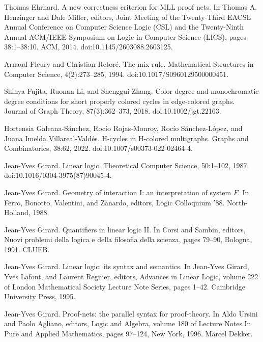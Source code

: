 \par\noindent  [10]  Thomas Ehrhard.  A new correctness criterion for MLL proof nets.  In Thomas A. Henzinger and Dale Miller, editors, Joint Meeting of the Twenty-Third EACSL Annual Conference on Computer Science Logic (CSL) and the Twenty-Ninth Annual ACM/IEEE Symposium on Logic in Computer Science (LICS), pages 38:1–38:10. ACM, 2014.  doi:10.1145/2603088.2603125.  
 
\par\noindent  [11]  Arnaud Fleury and Christian Retoré.  The mix rule.  Mathematical Structures in Computer Science, 4(2):273–285, 1994.  doi:10.1017/S0960129500000451.  
 
\par\noindent  [12]  Shinya Fujita, Ruonan Li, and Shenggui Zhang.  Color degree and monochromatic degree conditions for short properly colored cycles in edge-colored graphs.  Journal of Graph Theory, 87(3):362–373, 2018.  doi:10.1002/jgt.22163.  
 
\par\noindent  [13]  Hortensia Galeana-Sánchez, Rocío Rojas-Monroy, Rocío Sánchez-López, and Juana Imelda Villareal-Valdés.  H-cycles in H-colored multigraphs.  Graphs and Combinatorics, 38:62, 2022.  doi:10.1007/s00373-022-02464-4.  
 
\par\noindent  [14]  Jean-Yves Girard.  Linear logic.  Theoretical Computer Science, 50:1–102, 1987.  doi:10.1016/0304-3975(87)90045-4.  
 
\par\noindent  [15]  Jean-Yves Girard.  Geometry of interaction I: an interpretation of system ${F}$.  In Ferro, Bonotto, Valentini, and Zanardo, editors, Logic Colloquium ’88. North-Holland, 1988.  
 
\par\noindent  [16]  Jean-Yves Girard.  Quantifiers in linear logic II.  In Corsi and Sambin, editors, Nuovi problemi della logica e della filosofia della scienza, pages 79–90, Bologna, 1991. CLUEB.  
 
\par\noindent  [17]  Jean-Yves Girard.  Linear logic: its syntax and semantics.  In Jean-Yves Girard, Yves Lafont, and Laurent Regnier, editors, Advances in Linear Logic, volume 222 of London Mathematical Society Lecture Note Series, pages 1–42. Cambridge University Press, 1995.  
 
\par\noindent  [18]  Jean-Yves Girard.  Proof-nets: the parallel syntax for proof-theory.  In Aldo Ursini and Paolo Agliano, editors, Logic and Algebra, volume 180 of Lecture Notes In Pure and Applied Mathematics, pages 97–124, New York, 1996. Marcel Dekker.  
 
